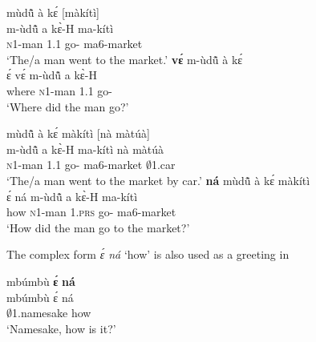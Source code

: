 \ea \label{eve}
  \ea  \label{eve1}
  \glll mùdũ̂ à kɛ́ [màkítì] \\
    m-ùdũ̂ a kɛ̀-H {\db}ma-kítì \\
              \textsc{n}1-man 1.{\PST}1 go-{\R} {\db}ma6-market  \\
    \trans `The/a man went to the market.'
\ex\label{eve2}
  {\bfseries vɛ́} m-ùdũ̂ à kɛ́  \\
            ɛ́ vɛ́ m-ùdũ̂ a kɛ̀-H \\
             {\LOC} where \textsc{n}1-man 1.{\PST}1 go-{\PST} \\
   \trans `Where did the man go?'
\z
\z

\ea \label{ena}
  \ea  \label{ena1}
  \glll mùdũ̂ à kɛ́ màkítì [nà màtúà] \\
    m-ùdũ̂ a kɛ̀-H ma-kítì {\db}nà màtúà \\
             \textsc{n}1-man 1.{\PST}1 go-{\R} ma6-market {\db}{\COM} $\emptyset$1.car\\
   \trans `The/a man went to the market by car.'
\ex\label{ena2}
  {\bfseries ná} mùdũ̂ à kɛ́ màkítì  \\
        ɛ́ ná m-ùdũ̂ a kɛ̀-H ma-kítì \\
             {\LOC} how \textsc{n}1-man 1.\textsc{prs} go-{\R} ma6-market \\
    \trans `How did the man go to the market?'
\z
\z

\noindent The complex form {\itshape ɛ́ ná} `how' is also used as a greeting in 

\ea \label{enahow}
  \glll mbúmbù {\bfseries ɛ́} {\bfseries ná} \\
        mbúmbù ɛ́ ná \\
        $\emptyset$1.namesake {\LOC} how  \\
    \trans `Namesake, how is it?'
\z




